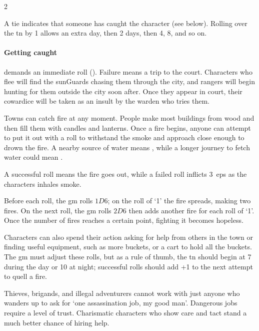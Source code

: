 \begin{multicols}{2}
{\begin{boxtable}[cY]
  \end{boxtable}
}
A tie indicates that someone has caught the character (see below).
Rolling over the \gls{tn} by 1 allows an extra day, then 2 days, then 4, 8, and so on.

\paragraph{Getting caught}
demands an immediate  roll (\tn[10]).
Failure means a trip to the \gls{court}.
Characters who flee will find the \glspl{sunGuard} chasing them through the city, and \glspl{ranger} will begin hunting for them outside the city soon after.
Once they appear in \gls{court}, their cowardice will be taken as an insult by the \gls{warden} who tries them.%

Towns can catch fire at any moment.
People make most buildings from wood and then fill them with candles and lanterns.
Once a fire begins, anyone can attempt to put it out with a  roll to withstand the smoke and approach close enough to drown the fire.
A nearby source of water means \tn[12], while a longer journey to fetch water could mean \tn[16].

A successful roll means the fire goes out, while a failed roll inflicts 3~\glspl{ep} as the characters inhales smoke.

Before each roll, the \gls{gm} rolls $1D6$; on the roll of `1' the fire spreads, making two fires.
On the next roll, the \gls{gm} rolls $2D6$ then adds another fire for each roll of `1'.
Once the number of fires reaches a certain point, fighting it becomes hopeless.

Characters can also spend their action asking for help from others in the town or finding useful equipment, such as more buckets, or a cart to hold all the buckets.
The \gls{gm} must adjust these rolls, but as a rule of thumb, the \gls{tn} should begin at 7 during the day or 10 at night; successful rolls should add +1 to the next attempt to quell a fire.

Thieves, brigands, and illegal adventurers cannot work with just anyone who wanders up to ask for `one assassination job, my good man'.
Dangerous jobs require a level of trust.
Charismatic characters who show care and tact stand a much better chance of hiring help.


\end{multicols}
